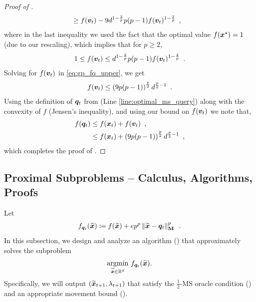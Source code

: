\begin{proof}[Proof of ]
\begin{align}
    &\ge f(\bm{v}_t)-9d^{1-\frac{2}{p}}p(p-1)f(\bm{v}_t)^{1-\frac{2}{p}}\enspace,\label{eq:gp_fq_upper}
\end{align}
where in the last inequality we used the fact that the optimal value $f(\bm{x}^\star)=1$ (due to our rescaling), which implies that for $p\geq 2$,
$$1 \leq f(\bm{v}_t) \leq d^{1-\frac{2}{p}}p(p-1)f(\bm{v}_t)^{1-\frac{2}{p}}\enspace.$$
Solving for $f(\bm{v}_t)$ in \eqref{eq:gp_fq_upper}, we get
\begin{align*}
    f(\bm{v}_t) \le \left(9p(p-1)\right)^{\frac{p}{2}}d^{\frac{p}{2}-1}\enspace.
\end{align*}
Using the definition of $\bm{q}_t$ from  (Line \ref{line:optimal_ms_query}) along with the convexity of $f$ (Jensen's inequality), and using our bound on $f(\bm{v}_t)$ we note that,
\begin{align*}
    f(\bm{q}_t) &\le f(\bm{x}_t) + f(\bm{v}_t)\enspace,\\
    &\leq f(\bm{x}_t) + \left(9p(p-1)\right)^{\frac{p}{2}}d^{\frac{p}{2}-1}\enspace,
\end{align*}
which completes the proof of .
\end{proof}

\subsection{Proximal Subproblems -- Calculus, Algorithms, Proofs}
\label{sec:gp_prox_solver}

Let
\begin{align*}
    f_{\bm{q}_t}(\widetilde{\bm{x}}) \coloneqq f(\widetilde{\bm{x}})+ep^p\left\lVert \widetilde{\bm{x}}-\bm{q}_t \right\rVert_{\mathbf{M}}^p\enspace.
\end{align*}
In this subsection, we design and analyze an algorithm () that approximately solves the subproblem
\begin{align*}
    \underset{\widetilde{\bm{x}}\in\mathbb{R}^d}{\mathrm{argmin}}\  f_{\bm{q}_t}(\widetilde{\bm{x}}).
\end{align*} 
Specifically, we will output $(\widetilde{\bm{x}}_{t+1},\lambda_{t+1})$ that satisfy the $\frac{1}{2}$-MS oracle condition () and an appropriate movement bound ().

